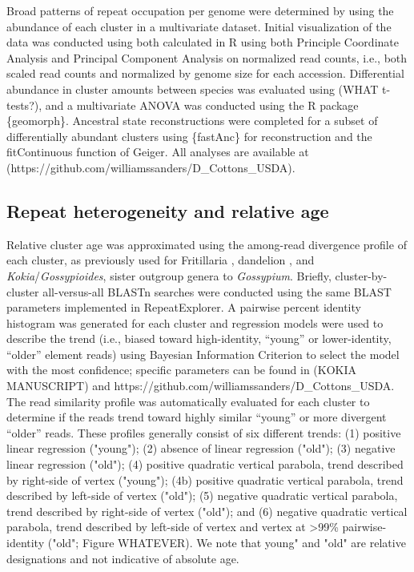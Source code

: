 \documentclass{bmcart}
\newcommand{\note}[2][]{\added[id=#1,remark={#2}]{}}
\begin{document}
Broad patterns of repeat occupation per genome were determined by using the abundance of each cluster in a multivariate dataset. Initial visualization of the data was conducted using both calculated in R \note[Corrinne]{citation} using both Principle Coordinate Analysis and Principal Component Analysis on normalized read counts, i.e., both scaled read counts and normalized by genome size for each accession. Differential abundance in cluster amounts between species was evaluated using (WHAT t-tests?), and a multivariate ANOVA was conducted using the R package \{geomorph\}. Ancestral state reconstructions were completed for a subset of differentially abundant clusters using \{fastAnc\} for reconstruction and the fitContinuous function of {Geiger}. All analyses are available at (https://github.com/williamssanders/D\_Cottons\_USDA).

\subsection*{Repeat heterogeneity and relative age}
Relative cluster age was approximated using the among-read divergence profile of each cluster, as previously used for Fritillaria \cite{Kelly2015}, dandelion \cite{Ferreira2016}, and \textit{Kokia}/\textit{Gossypioides}, sister outgroup genera to \textit{Gossypium}. Briefly, cluster-by-cluster all-versus-all BLASTn \cite{Boratyn2013, Altshul1990} searches were conducted using the same BLAST parameters implemented in RepeatExplorer. A pairwise percent identity histogram was generated for each cluster and regression models were used to describe the trend (i.e., biased toward high-identity, “young” or lower-identity, “older” element reads) using Bayesian Information Criterion \cite{Schwarz1978} to select the model with the most confidence; specific parameters can be found in (KOKIA MANUSCRIPT) and https://github.com/williamssanders/D\_Cottons\_USDA. The read similarity profile was automatically evaluated for each cluster to determine if the reads trend toward highly similar “young” or more divergent “older” reads. These profiles generally consist of six different trends: (1) positive linear regression ("young"); (2) absence of linear regression ("old"); (3) negative linear regression ("old"); (4) positive quadratic vertical parabola, trend described by right-side of vertex ("young"); (4b) positive quadratic vertical parabola, trend described by left-side of vertex ("old"); (5) negative quadratic vertical parabola, trend described by right-side of vertex ("old"); and (6) negative quadratic vertical parabola, trend described by left-side of vertex and vertex at >99\% pairwise-identity ("old"; Figure WHATEVER). We note that young" and "old" are relative designations and not indicative of absolute age. 
\end{document}
